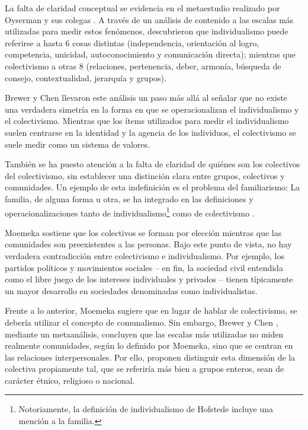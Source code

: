 \documentclass[12pt,twoside]{templates/facsothesis}
\begin{document}
La falta de claridad conceptual se evidencia en el metaestudio realizado por Oyserman y sus colegas \citeyearpar{oyserman2002}. A través de un análisis de contenido a las escalas más utilizadas para medir estos fenómenos, descubrieron que individualismo puede referirse a hasta 6 cosas distintas (independencia, orientación al logro, competencia, unicidad, autoconocimiento y comunicación directa); mientras que colectivismo a otras 8 (relaciones, pertenencia, deber, armonía, búsqueda de consejo, contextualidad, jerarquía y grupos).

Brewer y Chen \citeyearpar{brewer2007} llevaron este análisis un paso más allá al señalar que no existe una verdadera simetría en la forma en que se operacionalizan el individualismo y el colectivismo. Mientras que los ítems utilizados para medir el individualismo suelen centrarse en la identidad y la agencia de los individuos, el colectivismo se suele medir como un sistema de valores.

También se ha puesto atención a la falta de claridad de quiénes son los colectivos del colectivismo, sin establecer una distinción clara entre grupos, colectivos y comunidades. Un ejemplo de esta indefinición es el problema del familiarismo: La familia, de alguna forma u otra, se ha integrado en las definiciones y operacionalizaciones tanto de individualismo\footnote{Notoriamente, la definición de individualismo de Hofstede incluye una mención a la familia.} como de colectivismo \citep{oyserman2002}.

Moemeka \citeyearpar{moemeka1998} sostiene que los colectivos se forman por elección mientras que las comunidades son preexistentes a las personas. Bajo este punto de vista, no hay verdadera contradicción entre colectivismo e individualismo. Por ejemplo, los partidos políticos y movimientos sociales -- en fin, la sociedad civil entendida como el libre juego de los intereses individuales y privados \citep{arribas1999} -- tienen típicamente un mayor desarrollo en sociedades denominadas como individualistas.

Frente a lo anterior, Moemeka \citeyearpar{moemeka1998} sugiere que en lugar de hablar de colectivismo, se debería utilizar el concepto de comunalismo. Sin embargo, Brewer y Chen \citeyearpar{brewer2007}, mediante un metaanálisis, concluyen que las escalas más utilizadas no miden realmente comunidades, según lo definido por Moemeka, sino que se centran en las relaciones interpersonales. Por ello, proponen distinguir esta dimensión de la colectiva propiamente tal, que se referiría más bien a grupos enteros, sean de carácter étnico, religioso o nacional.
\end{document}
